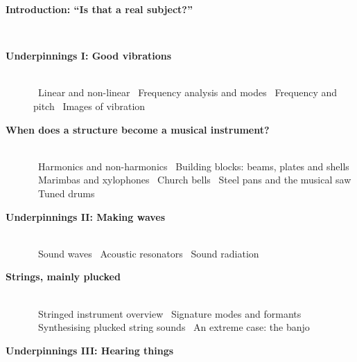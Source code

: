 \begin{description}\item[\hspace{-1cm}{\gre{}\pageref{s:80aa9fe9}}\hspace{+0cm} \large\bf\sf \blu Introduction: “Is that a real subject?”]\hfill \\ 
\item[\hspace{-1cm}{\gre{}\pageref{s:4e1e7b0a}}\hspace{+0cm} \large\bf\sf \blu Underpinnings I: Good vibrations]\hfill \\ 
\quad{\gre \pageref{s:cb664fff}}~Linear and non-linear
\quad{\gre \pageref{s:b3cc2a63}}~Frequency analysis and modes
\quad{\gre \pageref{s:1ac2ac62}}~Frequency and pitch
\quad{\gre \pageref{s:71d6691f}}~Images of vibration
\item[\hspace{-1cm}{\gre{}\pageref{s:ede3de60}}\hspace{+0cm} \large\bf\sf \blu When does a structure become a musical instrument?]\hfill \\ 
\quad{\gre \pageref{s:c2ad3a14}}~Harmonics and non-harmonics
\quad{\gre \pageref{s:cc77132d}}~Building blocks: beams, plates and shells
\quad{\gre \pageref{s:040aaef9}}~Marimbas and xylophones
\quad{\gre \pageref{s:771b6e96}}~Church bells
\quad{\gre \pageref{s:f3662a4b}}~Steel pans and the musical saw
\quad{\gre \pageref{s:b7408339}}~Tuned drums
\item[\hspace{-1cm}{\gre{}\pageref{s:c979ca30}}\hspace{+0cm} \large\bf\sf \blu Underpinnings II: Making waves]\hfill \\ 
\quad{\gre \pageref{s:31003940}}~Sound waves
\quad{\gre \pageref{s:9cc30fa1}}~Acoustic resonators
\quad{\gre \pageref{s:f00c42f7}}~Sound radiation
\item[\hspace{-1cm}{\gre{}\pageref{s:3c116382}}\hspace{+0cm} \large\bf\sf \blu Strings, mainly plucked]\hfill \\ 
\quad{\gre \pageref{s:e48b9b3f}}~Stringed instrument overview
\quad{\gre \pageref{s:598ef75a}}~Signature modes and formants
\quad{\gre \pageref{s:e2bec8d9}}~Synthesising plucked string sounds
\quad{\gre \pageref{s:f209e820}}~An extreme case: the banjo
\item[\hspace{-1cm}{\gre{}\pageref{s:6036bea2}}\hspace{+0cm} \large\bf\sf \blu Underpinnings III: Hearing things]\hfill \\ 

\end{description}
